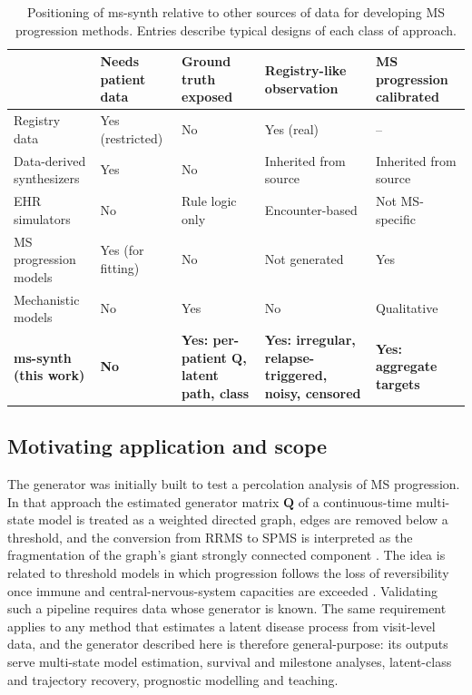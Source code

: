 \documentclass[11pt,a4paper]{article}
\newcommand{\Q}{\mathbf{Q}}
\begin{document}
\begin{table}[htbp]
\centering
\caption{Positioning of ms-synth relative to other sources of data for developing MS progression methods. Entries describe typical designs of each class of approach.}
\label{tab:positioning}
\small
\begin{tabularx}{\textwidth}{>{\raggedright\arraybackslash}p{3.3cm}>{\raggedright\arraybackslash}X>{\raggedright\arraybackslash}X>{\raggedright\arraybackslash}X>{\raggedright\arraybackslash}X}
\toprule
& \textbf{Needs patient data} & \textbf{Ground truth exposed} & \textbf{Registry-like observation} & \textbf{MS progression calibrated} \\
\midrule
Registry data \cite{butzkueven2006,magyari2021} & Yes (restricted) & No & Yes (real) & -- \\
Data-derived synthesizers \cite{nowok2016,stadler2022} & Yes & No & Inherited from source & Inherited from source \\
EHR simulators \cite{walonoski2018} & No & Rule logic only & Encounter-based & Not MS-specific \\
MS progression models \cite{palace2014,tilling2016} & Yes (for fitting) & No & Not generated & Yes \\
Mechanistic models \cite{kannan2017} & No & Yes & No & Qualitative \\
\textbf{ms-synth (this work)} & \textbf{No} & \textbf{Yes: per-patient $\Q$, latent path, class} & \textbf{Yes: irregular, relapse-triggered, noisy, censored} & \textbf{Yes: aggregate targets} \\
\bottomrule
\end{tabularx}
\end{table}

\subsection*{Motivating application and scope}

The generator was initially built to test a percolation analysis of MS progression. In that approach the estimated generator matrix $\Q$ of a continuous-time multi-state model is treated as a weighted directed graph, edges are removed below a threshold, and the conversion from RRMS to SPMS is interpreted as the fragmentation of the graph's giant strongly connected component \cite{mirkov2026,newman2010}. The idea is related to threshold models in which progression follows the loss of reversibility once immune and central-nervous-system capacities are exceeded \cite{kannan2017}. Validating such a pipeline requires data whose generator is known. The same requirement applies to any method that estimates a latent disease process from visit-level data, and the generator described here is therefore general-purpose: its outputs serve multi-state model estimation, survival and milestone analyses, latent-class and trajectory recovery, prognostic modelling and teaching.
\end{document}
